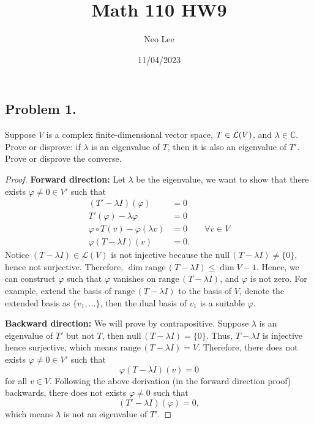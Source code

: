 \documentclass{article}
\title{Math 110 HW9}
\author{Neo Lee}
\date{11/04/2023}
\newcommand*{\range}{\ensuremath{\mathrm{range}}\,}
\newcommand*{\nul}{\ensuremath{\mathrm{null}}\,}
\newcommand*{\C}{\ensuremath{\mathbb{C}}}
\begin{document}
 

\maketitle 

\subsection*{Problem 1.}
Suppose $V$ is a complex finite-dimensional  vector space, $T \in {\cal L}(V)$, and $\lambda \in \C$. 
Prove or disprove: if $\lambda$ is an eigenvalue of $T$, then it is also an eigenvalue of $T'$. 
Prove or disprove the converse.
\begin{proof}
    \textbf{Forward direction:}
    Let $\lambda$ be the eigenvalue, we want to show that there exists $\varphi\neq 0\in V'$ such that 
    \begin{align*}
        (T'-\lambda I)(\varphi) & = 0 \\
        T'(\varphi) - \lambda \varphi & = 0 \\
        \varphi \circ T(v) - \varphi(\lambda v) & = 0 \qquad \forall v\in V\\
        \varphi \left(T-\lambda I\right)(v) & = 0.
    \end{align*}
    Notice $(T-\lambda I)\in \mathcal{L}(V)$ is not injective because the $\nul(T-\lambda I)\neq \{0\}$, hence not surjective. Therefore, 
    $\dim \range(T-\lambda I)\le \dim V - 1$. Hence, we can construct $\varphi$ such 
    that $\varphi$ vanishes on $\range(T-\lambda I)$, and $\varphi$ is not zero. For example, 
    extend the basis of $\range(T-\lambda I)$ to the basis of $V$, denote the extended basis as 
    $\{v_1,\dots\}$, then the dual basis of $v_1$ is a suitable $\varphi$.

    \textbf{Backward direction:} We will prove by contrapositive. Suppose $\lambda$ is an 
    eigenvalue of $T'$ but not $T$, then $\nul(T-\lambda I) = \{0\}$. Thus, $T-\lambda I$ is 
    injective hence surjective, which means $\range(T-\lambda I) = V$. Therefore, there does not 
    exists $\varphi\neq 0\in V'$ such that $$\varphi \left(T-\lambda I\right)(v) = 0$$ for all $v\in V$.
    Following the above derivation (in the forward direction proof) backwards, there does not exists $\varphi\neq 0$ such that 
    $$(T'-\lambda I)(\varphi) = 0,$$ which means $\lambda$ is not an eigenvalue of $T'$.
\end{proof}
\end{document}
